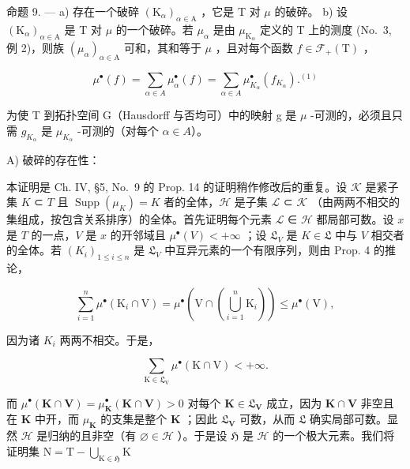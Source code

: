 命题 9. --- a) 存在一个破碎 \((\mathrm{K}_{\alpha})_{\alpha \in \mathrm{A}}\) ，它是 T 对 \(\mu\) 的破碎。 b) 设 \((\mathrm{K}_{\alpha})_{\alpha \in \mathrm{A}}\) 是 T 对 \(\mu\) 的一个破碎。若 \(\mu_{\alpha}\) 是由 \(\mu_{\mathrm{K}_{\alpha}}\) 定义的 T 上的测度 (No.~3, 例 2)，则族 \((\mu_{\alpha})_{\alpha \in \mathrm{A}}\) 可和，其和等于 \(\mu\) ，且对每个函数 \(f \in \mathcal{F}_{+}(\mathrm{T})\) ，

\[
\mu^ {\bullet} (f) = \sum_ {\alpha \in A} \mu_ {\alpha} ^ {\bullet} (f) = \sum_ {\alpha \in A} \mu_ {K _ {\alpha}} ^ {\bullet} (f _ {K _ {\alpha}}). ^ {(1)}\tag{7}
\]

为使 T 到拓扑空间 G（Hausdorff 与否均可）中的映射 g 是 \(\mu\) -可测的，必须且只需 \(g_{K_{\alpha}}\) 是 \(\mu_{K_{\alpha}}\) -可测的（对每个 \(\alpha \in A\)）。

A) 破碎的存在性：

本证明是 Ch. IV, §5, No.~9 的 Prop. 14 的证明稍作修改后的重复。设 \(\mathcal{K}\) 是紧子集 \(K\) ⊂ \(T\) 且 \(\operatorname{Supp}(\mu_K) = K\) 者的全体，\(\mathcal{H}\) 是子集 \(\mathcal{L}\) ⊂ \(\mathcal{K}\) （由两两不相交的集组成，按包含关系排序）的全体。首先证明每个元素 \(\mathcal{L}\) ∈ \(\mathcal{H}\) 都局部可数。设 \(x\) 是 \(T\) 的一点，\(V\) 是 \(x\) 的开邻域且 \(\mu^\bullet(V) < +\infty\) ；设 \(\mathfrak{L}_V\) 是 \(K \in \mathfrak{L}\) 中与 \(V\) 相交者的全体。若 \((K_i)_{1 \leqslant i \leqslant n}\) 是 \(\mathfrak{L}_V\) 中互异元素的一个有限序列，则由 Prop. 4 的推论，

\[
\sum_ {i = 1} ^ {n} \mu^ {\bullet} (\mathrm{K} _ {i} \cap \mathrm{V}) = \mu^ {\bullet} \left(\mathrm{V} \cap \left(\bigcup_ {i = 1} ^ {n} \mathrm{K} _ {i}\right)\right) \leqslant \mu^ {\bullet} (\mathrm{V}),
\]

因为诸 \(K_{i}\) 两两不相交。于是，

\[
\sum_ {\mathrm{K} \in \mathfrak {L} _ {\mathrm{V}}} \mu^ {\bullet} (\mathrm{K} \cap \mathrm{V}) <   + \infty .
\]

而 \(\mu^{\bullet}(\mathbf{K}\cap \mathbf{V}) = \mu_{\mathbf{K}}^{\bullet}(\mathbf{K}\cap \mathbf{V}) > 0\) 对每个 \(\mathbf{K}\in \mathfrak{L}_{\mathbf{V}}\) 成立，因为 \(\mathbf{K}\cap \mathbf{V}\) 非空且在 \(\mathbf{K}\) 中开，而 \(\mu_{\mathbf{K}}\) 的支集是整个 \(\mathbf{K}\) ；因此 \(\mathfrak{L}_{\mathbf{V}}\) 可数，从而 \(\mathfrak{L}\) 确实局部可数。显然 \(\mathcal{H}\) 是归纳的且非空（有 \(\varnothing \in \mathcal{H}\) ）。于是设 \(\mathfrak{H}\) 是 \(\mathcal{H}\) 的一个极大元素。我们将证明集 \(\mathrm{N} = \mathrm{T} - \bigcup_{\mathrm{K}\in \mathfrak{H}}\mathrm{K}\)


